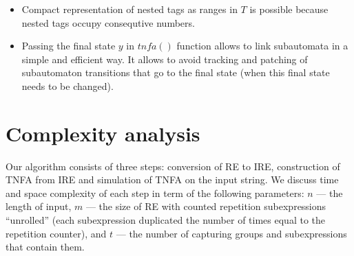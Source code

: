 \documentclass[AMA,STIX1COL]{WileyNJD-v2}
\begin{document}
\begin{itemize}[itemsep=0.5em]
    \item Compact representation of nested tags as ranges in $T$
        is possible because nested tags occupy consequtive numbers.

    \item Passing the final state $y$ in $tn\!f\!a()$ function allows to link subautomata in a simple and efficient way.
        It allows to avoid tracking and patching of subautomaton transitions that go to the final state
        (when this final state needs to be changed).
    \\
\end{itemize}


\section{Complexity analysis}\label{section_complexity}

Our algorithm consists of three steps: conversion of RE to IRE,
construction of TNFA from IRE
and simulation of TNFA on the input string.
We discuss time and space complexity of each step
in term of the following parameters:
$n$ --- the length of input,
$m$ --- the size of RE with counted repetition subexpressions ``unrolled''
(each subexpression duplicated the number of times equal to the repetition counter),
and $t$ --- the number of capturing groups and subexpressions that contain them.
\\
\end{document}
